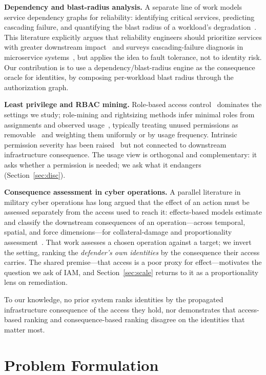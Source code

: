 \documentclass[conference]{IEEEtran}
\begin{document}
\textbf{Dependency and blast-radius analysis.} A separate line of work models
service dependency graphs for reliability: identifying critical services,
predicting cascading failure, and quantifying the blast radius of a workload's
degradation~\cite{aid,failsurvey}. This literature explicitly argues that
reliability engineers should prioritize services with greater downstream
impact~\cite{aid} and surveys cascading-failure diagnosis in microservice
systems~\cite{failsurvey}, but applies the idea to fault tolerance, not to identity
risk. Our contribution is to use a dependency/blast-radius engine as the
consequence oracle for identities, by composing per-workload blast radius through
the authorization graph.

\textbf{Least privilege and RBAC mining.} Role-based access control~\cite{rbac,nist}
dominates the settings we study; role-mining and rightsizing methods infer minimal
roles from assignments and observed usage~\cite{rmp,roleminer,rminesurvey,semrole},
typically treating unused permissions as removable~\cite{awsiam} and weighting them
uniformly or by usage frequency. Intrinsic permission severity has been
raised~\cite{severity} but not connected to downstream infrastructure consequence.
The usage view is orthogonal and complementary: it asks whether a permission is
needed; we ask what it endangers (Section~\ref{sec:disc}).

\textbf{Consequence assessment in cyber operations.} A parallel literature in
military cyber operations has long argued that the effect of an action must be assessed
separately from the access used to reach it: effects-based models estimate and classify
the downstream consequences of an operation---across temporal, spatial, and force
dimensions---for collateral-damage and proportionality
assessment~\cite{maathuis18,maathuis21}. That work assesses a chosen operation against a
target; we invert the setting, ranking the \emph{defender's own identities} by the
consequence their access carries. The shared premise---that access is a poor proxy for
effect---motivates the question we ask of IAM, and Section~\ref{sec:scale} returns to it
as a proportionality lens on remediation.

To our knowledge, no prior system ranks identities by the propagated infrastructure
consequence of the access they hold, nor demonstrates that access-based ranking and
consequence-based ranking disagree on the identities that matter most.

\section{Problem Formulation}
\end{document}
